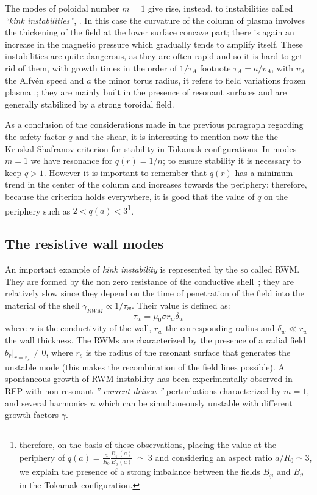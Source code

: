 %
The modes of poloidal number $m = 1$ give rise, instead, to instabilities called \emph{``kink instabilities''}, \Figure{\ref{fig:press-curr2}}. In this case the curvature of the column of plasma involves the thickening of the field at the lower surface concave part; there is again an increase in the magnetic pressure which gradually tends to amplify itself.
%
These instabilities are quite dangerous, as they are often rapid and so it is hard to get rid of them, with growth times in the order of $1/\tau_A$ footnote {$\tau_A = a/v_A$, with $ v_A $ the Alfvén speed and $a$ the minor torus radius, it refers to field variations frozen plasma \cite{fridberg}.}; they are mainly built in the presence of resonant surfaces and are generally stabilized by a strong toroidal field.

As a conclusion of the considerations made in the previous paragraph regarding the safety factor $ q $ and the shear, it is interesting to mention now the the Kruskal-Shafranov criterion for stability in Tokamak configurations. In modes $ m = 1 $ we have resonance for $q(r)=1/n$; to ensure stability it is necessary to keep $ q>1 $. However it is important to remember that $ q (r) $ has a minimum trend in the center of the column and increases towards the periphery; therefore, because the criterion holds everywhere, it is good that the value of $ q $ on the periphery such as $ 2<q(a)<3 $\footnote{therefore, on the basis of these observations, placing the value at the periphery of $q(a)=\frac{a}{R_0}\frac{B_\varphi(a)}{B_\vartheta(a)}~\simeq~3$ and considering an aspect ratio $a/R_0 \simeq 3$, we explain the presence of a strong imbalance between the fields $B_\varphi$ and $B_\vartheta$ in the Tokamak configuration.}.


\subsection{The resistive wall modes}

An important example of \textit{kink instability} is represented by the so called \ac{RWM}. They are formed by the non zero resistance of the conductive shell~\cite{144132475}; they are relatively slow since they depend on the time of penetration of the field into the material of the shell $\gamma_{RWM} \propto 1/\tau_w$. Their value is defined as:
%
\begin{equation}
 \tau_w = \mu_0 \sigma r_w \delta_w
\end{equation}
%
where $\sigma$ is the conductivity of the wall, $ r_w $ the corresponding radius and $\delta_w \ll r_w$ the wall thickness. The \acs{RWM}s are characterized by the presence of a radial field $b_r|_{r=r_s} \neq 0$, where $ r_s $ is the radius of the resonant surface that generates the unstable mode (this makes the recombination of the field lines possible).
%
A spontaneous growth of \acs{RWM} instability has been experimentally observed in \acs{RFP} with non-resonant \emph{'' current driven ''} perturbations characterized by $ m = 1 $, and several harmonics $ n $ which can be simultaneously unstable with different growth factors $\gamma$\cite{pizz46}\cite{pizz47}\cite{gregoratto}.

